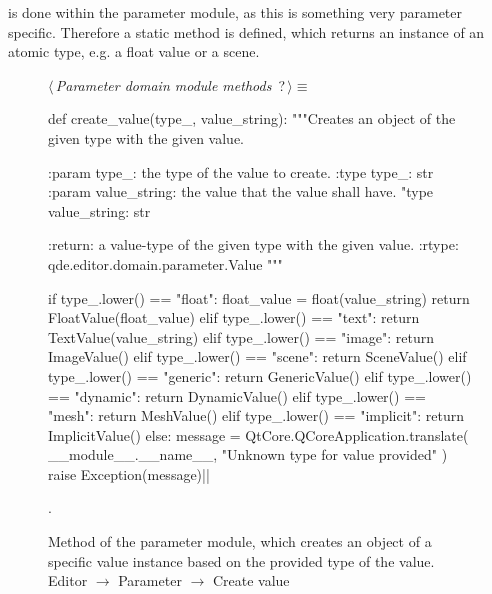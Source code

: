 \documentclass[%
    a4paper,    %
    justified,  %
    nobib,      %
    openany     %
]{tufte-book}
\makeatletter
\renewcommand{\label}[1]{\@tufte@label{##1}}%
\makeatother
\begin{document}
 is done within the
parameter module, as this is something very parameter specific. Therefore a
static method is defined, which returns an instance of an atomic type, e.g. a
float value or a scene. 

\begin{figure}
\begin{flushleft} \small
\begin{minipage}{\linewidth}\label{scrap129}\raggedright\small
{} $\langle\,${\itshape Parameter domain module methods}\nobreak\ {\footnotesize {?}}$\,\rangle\equiv$
\vspace{-1ex}
\begin{pythoncode}
def create_value(type_, value_string):
    """Creates an object of the given type with the given value.

    :param type_: the type of the value to create.
    :type  type_: str
    :param value_string: the value that the value shall have.
    "type  value_string: str

    :return: a value-type of the given type with the given value.
    :rtype: qde.editor.domain.parameter.Value
    """

    if type_.lower() == "float":
        float_value = float(value_string)
        return FloatValue(float_value)
    elif type_.lower() == "text":
        return TextValue(value_string)
    elif type_.lower() == "image":
        return ImageValue()
    elif type_.lower() == "scene":
        return SceneValue()
    elif type_.lower() == "generic":
        return GenericValue()
    elif type_.lower() == "dynamic":
        return DynamicValue()
    elif type_.lower() == "mesh":
        return MeshValue()
    elif type_.lower() == "implicit":
        return ImplicitValue()
    else:
        message = QtCore.QCoreApplication.translate(
            __module__.__name__, "Unknown type for value provided"
        )
        raise Exception(message)|\NWsep|
\end{pythoncode}
\vspace{1.5ex}
\footnotesize
\begin{list}{}{\setlength{\itemsep}{-\parsep}\setlength{\itemindent}{-\leftmargin}}
\item {\NWtxtMacroNoRef}.

\item{}
\end{list}
\end{minipage}\vspace{4ex}
\end{flushleft}
\caption{Method of the parameter module, which creates an object of a specific
  value instance based on the provided type of the value.
  \newline{}\newline{}Editor $\rightarrow$ Parameter $\rightarrow$
  Create value}
\label{editor:lst:parameter:create-value}
\end{figure}
\end{document}

